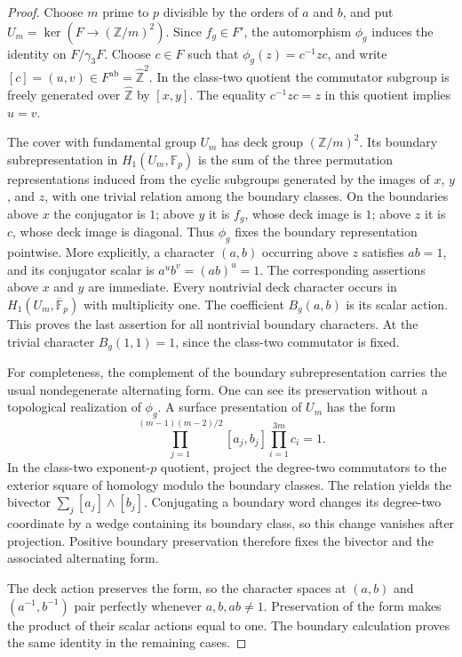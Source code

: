 \begin{proof}
Choose $m$ prime to $p$ divisible by the orders of $a$ and $b$, and
put $U_m=\ker(F\to(\mathbb Z/m)^2)$.  Since $f_g\in F'$, the
automorphism $\phi_g$ induces the identity on $F/\gamma_3F$.  Choose
$c\in F$ such that $\phi_g(z)=c^{-1}zc$, and write
$[c]=(u,v)\in F^{\mathrm{ab}}=\widehat{\mathbb Z}^2$.  In the
class-two quotient the commutator subgroup is freely generated over
$\widehat{\mathbb Z}$ by $[x,y]$.  The equality $c^{-1}zc=z$ in this
quotient implies $u=v$.

The cover with fundamental group $U_m$ has deck group $(\mathbb Z/m)^2$.
Its boundary subrepresentation in $H_1(U_m,\mathbb F_p)$ is the sum
of the three permutation representations induced from the cyclic
subgroups generated by the images of $x$, $y$, and $z$, with one
trivial relation among the boundary classes.  On the boundaries above
$x$ the conjugator is $1$; above $y$ it is $f_g$, whose deck image is
$1$; above $z$ it is $c$, whose deck image is diagonal.  Thus $\phi_g$
fixes the boundary representation pointwise.  More explicitly, a
character $(a,b)$ occurring above $z$ satisfies $ab=1$, and its
conjugator scalar is $a^u b^v=(ab)^u=1$.  The corresponding assertions
above $x$ and $y$ are immediate.  Every nontrivial deck character
occurs in $H_1(U_m,\overline{\mathbb F}_p)$ with multiplicity one.
The coefficient $B_g(a,b)$ is its scalar action.  This proves the
last assertion for all nontrivial boundary characters.  At the trivial
character $B_g(1,1)=1$, since the class-two commutator is fixed.

For completeness, the complement of the boundary subrepresentation
carries the usual nondegenerate alternating form.  One can see its
preservation without a topological realization of $\phi_g$.  A surface
presentation of $U_m$ has the form
\[
 \prod_{j=1}^{(m-1)(m-2)/2}[a_j,b_j]
       \prod_{i=1}^{3m}c_i=1.
\]
In the class-two exponent-$p$ quotient, project the degree-two
commutators to the exterior square of homology modulo the boundary
classes.  The relation yields the bivector
$\sum_j[a_j]\wedge[b_j]$.  Conjugating a boundary word changes its
degree-two coordinate by a wedge containing its boundary class, so
this change vanishes after projection.  Positive boundary preservation
therefore fixes the bivector and the associated alternating form.

The deck action preserves the form, so the character spaces at
$(a,b)$ and $(a^{-1},b^{-1})$ pair perfectly whenever
$a,b,ab\ne1$.  Preservation of the form makes the product of their
scalar actions equal to one.  The boundary calculation proves the
same identity in the remaining cases.
\end{proof}

